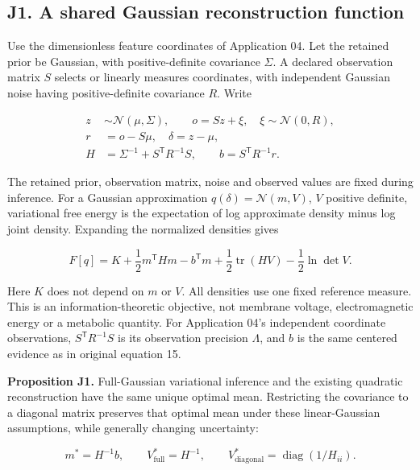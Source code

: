 \documentclass[
  american,
  11pt,
  letterpaper,
]{article}
\begin{document}
\subsection{J1. A shared Gaussian reconstruction function}\label{j1.-a-shared-gaussian-reconstruction-function}

Use the dimensionless feature coordinates of Application 04. Let the retained prior be Gaussian, with positive-definite covariance \(\Sigma\). A declared observation matrix \(S\) selects or linearly measures coordinates, with independent Gaussian noise having positive-definite covariance \(R\). Write

\begin{equation}
\begin{aligned}
z&\sim\mathcal N(\mu,\Sigma),\qquad o=Sz+\xi,\quad\xi\sim\mathcal N(0,R),\\
r&=o-S\mu,\quad\delta=z-\mu,\\
H&=\Sigma^{-1}+S^{\mathsf T}R^{-1}S,\qquad
b=S^{\mathsf T}R^{-1}r.
\end{aligned}\tag{J1}
\end{equation}

The retained prior, observation matrix, noise and observed values are fixed during inference. For a Gaussian approximation \(q(\delta)=\mathcal N(m,V)\), \(V\) positive definite, variational free energy is the expectation of log approximate density minus log joint density. Expanding the normalized densities gives

\begin{equation}
F[q]=K+\frac12m^{\mathsf T}Hm-b^{\mathsf T}m
       +\frac12\operatorname{tr}(HV)-\frac12\ln\det V.
\tag{J2}
\end{equation}

Here \(K\) does not depend on \(m\) or \(V\). All densities use one fixed reference measure. This is an information-theoretic objective, not membrane voltage, electromagnetic energy or a metabolic quantity. For Application 04's independent coordinate observations, \(S^{\mathsf T}R^{-1}S\) is its observation precision \(\Lambda\), and \(b\) is the same centered evidence as in original equation 15.

\textbf{Proposition J1.} Full-Gaussian variational inference and the existing quadratic reconstruction have the same unique optimal mean. Restricting the covariance to a diagonal matrix preserves that optimal mean under these linear-Gaussian assumptions, while generally changing uncertainty:

\begin{equation}
m^*=H^{-1}b,\qquad
V^*_{\mathrm{full}}=H^{-1},\qquad
V^*_{\mathrm{diagonal}}=\operatorname{diag}(1/H_{ii}).
\tag{J3}
\end{equation}
\end{document}
